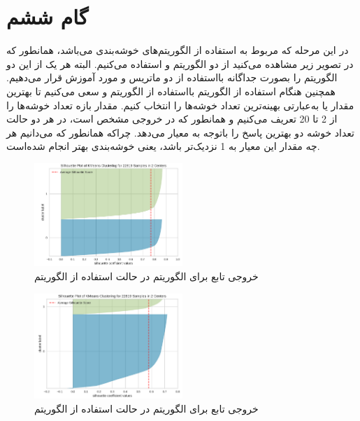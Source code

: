\documentclass{article}
\begin{document}
\section{گام ششم}
در این مرحله که مربوط به استفاده از الگوریتم‌های خوشه‌بندی می‌باشد، همانطور که در تصویر زیر مشاهده می‌کنید از دو الگوریتم  و  استفاده می‌کنیم. البته هر یک از این دو الگوریتم را بصورت جداگانه بااستفاده از دو ماتریس  و  مورد آموزش قرار می‌دهیم.
همچنین هنگام استفاده از الگوریتم  بااستفاده از الگوریتم  و  سعی می‌کنیم تا بهترین مقدار  یا به‌عبارتی بهینه‌ترین تعداد خوشه‌ها را انتخاب کنیم. مقدار بازه تعداد خوشه‌ها را از 2 تا 20 تعریف می‌کنیم و همانطور که در خروجی مشخص است، در هر دو حالت تعداد خوشه دو بهترین پاسخ را باتوجه به معیار  می‌دهد. چراکه همانطور که می‌دانیم هر چه مقدار این معیار به 1 نزدیک‌تر باشد، یعنی خوشه‌بندی بهتر انجام شده‌است. 
\begin{figure}[ht]
        \centering
        \includegraphics[width=0.5\textwidth]{step-6-sil-kmeans-tfidf.png}
        \caption{خروجی تابع  برای الگوریتم  در حالت استفاده از الگوریتم }
        \label{fig:fig7}
\end{figure}

\begin{figure}[ht]
        \centering
        \includegraphics[width=0.5\textwidth]{step-6-sil-kmeans-bow.png}
        \caption{خروجی تابع  برای الگوریتم  در حالت استفاده از الگوریتم }
        \label{fig:fig8}
\end{figure}
\end{document}
